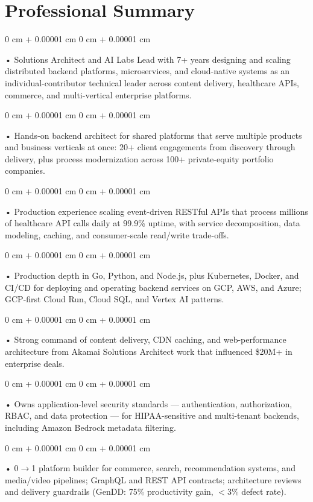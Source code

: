 \documentclass[10pt, letterpaper]{article}
\newenvironment{onecolentry}{
    \begin{adjustwidth}{
        0 cm + 0.00001 cm
    }{
        0 cm + 0.00001 cm
    }
}{
    \end{adjustwidth}
} %
\begin{document}
    \section{Professional Summary}
        \vspace{2 pt }
        \begin{onecolentry}
            • Solutions Architect and AI Labs Lead with 7+ years designing and scaling distributed backend platforms, microservices, and cloud-native systems as an individual-contributor technical leader across content delivery, healthcare APIs, commerce, and multi-vertical enterprise platforms.
        \end{onecolentry}
        \begin{onecolentry}
            • Hands-on backend architect for shared platforms that serve multiple products and business verticals at once: 20+ client engagements from discovery through delivery, plus process modernization across 100+ private-equity portfolio companies.
        \end{onecolentry}
        \begin{onecolentry}
            • Production experience scaling event-driven RESTful APIs that process millions of healthcare API calls daily at 99.9\% uptime, with service decomposition, data modeling, caching, and consumer-scale read/write trade-offs.
        \end{onecolentry}
        \begin{onecolentry}
            • Production depth in Go, Python, and Node.js, plus Kubernetes, Docker, and CI/CD for deploying and operating backend services on GCP, AWS, and Azure; GCP-first Cloud Run, Cloud SQL, and Vertex AI patterns.
        \end{onecolentry}
        \begin{onecolentry}
            • Strong command of content delivery, CDN caching, and web-performance architecture from Akamai Solutions Architect work that influenced \$20M+ in enterprise deals.
        \end{onecolentry}
        \begin{onecolentry}
            • Owns application-level security standards --- authentication, authorization, RBAC, and data protection --- for HIPAA-sensitive and multi-tenant backends, including Amazon Bedrock metadata filtering.
        \end{onecolentry}
        \begin{onecolentry}
            • 0$\rightarrow$1 platform builder for commerce, search, recommendation systems, and media/video pipelines; GraphQL and REST API contracts; architecture reviews and delivery guardrails (GenDD: 75\% productivity gain, $<$3\% defect rate).
        \end{onecolentry}
\end{document}
